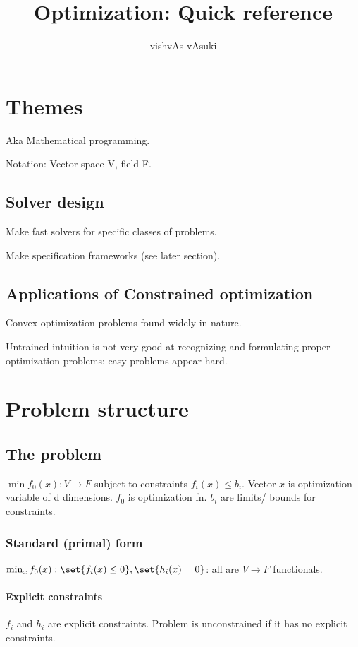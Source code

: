 \documentclass[oneside, article]{memoir}
\title{Optimization: Quick reference}
\author{vishvAs vAsuki}
\begin{document}
\maketitle
\tableofcontents

\part{Themes}
Aka Mathematical programming.

Notation: Vector space V, field F.

\chapter{Solver design}
Make fast solvers for specific classes of problems.

Make specification frameworks (see later section).

\chapter{Applications of Constrained optimization}
Convex optimization problems found widely in nature.

Untrained intuition is not very good at recognizing and formulating proper optimization problems: easy problems appear hard.

\part{Problem structure}

\chapter{The problem}
$\min f_{0}(x): V \to F$ subject to constraints $f_{i}(x) \leq b_{i}$. Vector $x$ is optimization variable of d dimensions. $f_0$ is optimization fn. $b_i$ are limits/ bounds for constraints.

\section{Standard (primal) form}
$\min_x f_{0}(x): \set{f_{i}(x) \leq 0}, \set{h_{i}(x) = 0} $: all are $V \to F$ functionals.

\subsection{Explicit constraints}
$f_i$ and $h_i$ are explicit constraints. Problem is unconstrained if it has no explicit constraints.
\end{document}
